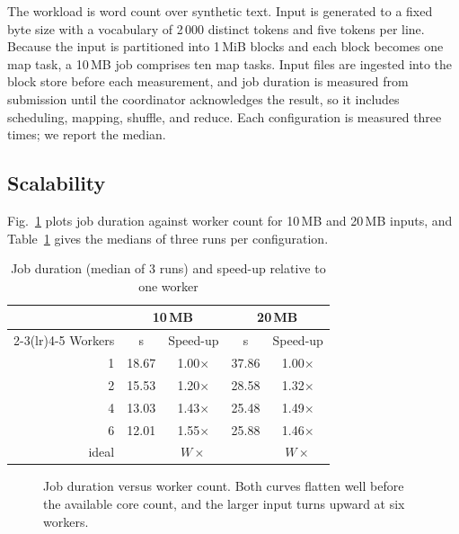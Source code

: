 \documentclass[conference]{IEEEtran}
\begin{document}
The workload is word count over synthetic text. Input is generated to a
fixed byte size with a vocabulary of 2\,000 distinct tokens and five tokens
per line. Because the input is partitioned into 1\,MiB blocks and each block
becomes one map task, a 10\,MB job comprises ten map tasks. Input files are
ingested into the block store before each measurement, and job duration is
measured from submission until the coordinator acknowledges the result, so
it includes scheduling, mapping, shuffle, and reduce. Each configuration is
measured three times; we report the median.

\subsection{Scalability}

Fig.~\ref{fig:scaling} plots job duration against worker count for 10\,MB
and 20\,MB inputs, and Table~\ref{tab:scaling} gives the medians of three
runs per configuration.

\begin{table}[t]
\caption{Job duration (median of 3 runs) and speed-up relative to one worker}
\label{tab:scaling}
\centering
\begin{tabular}{@{}rcccc@{}}
\toprule
 & \multicolumn{2}{c}{10\,MB} & \multicolumn{2}{c}{20\,MB} \\
\cmidrule(lr){2-3}\cmidrule(lr){4-5}
Workers & s & Speed-up & s & Speed-up \\
\midrule
1 & 18.67 & 1.00$\times$ & 37.86 & 1.00$\times$ \\
2 & 15.53 & 1.20$\times$ & 28.58 & 1.32$\times$ \\
4 & 13.03 & 1.43$\times$ & 25.48 & 1.49$\times$ \\
6 & 12.01 & 1.55$\times$ & 25.88 & 1.46$\times$ \\
\midrule
ideal & & $W\times$ & & $W\times$ \\
\bottomrule
\end{tabular}
\end{table}

\begin{figure}[t]
\centering
{}
\caption{Job duration versus worker count. Both curves flatten well before
the available core count, and the larger input turns upward at six workers.}
\label{fig:scaling}
\end{figure}
\end{document}
